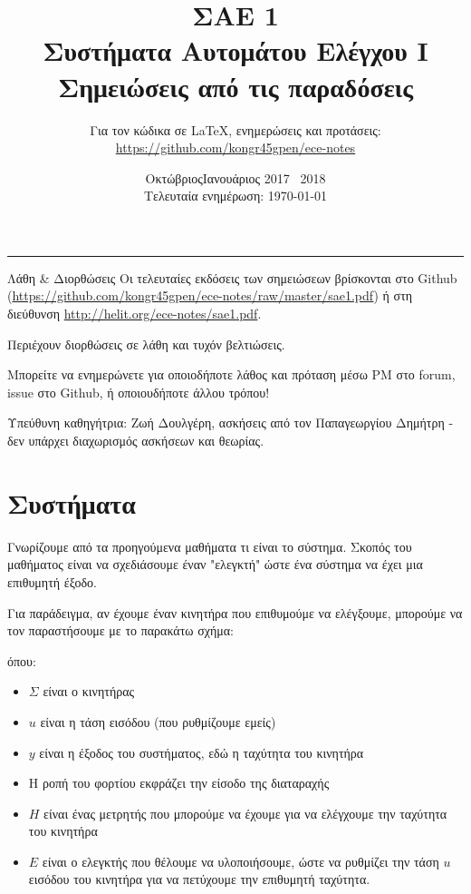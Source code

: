 \documentclass[11pt,a4paper,notitlepage,fleqn]{article}
\title{ΣΑΕ 1
	\\
	{ 
		\normalsize Συστήματα Αυτομάτου Ελέγχου I
		\\
		\normalsize Σημειώσεις από τις παραδόσεις
	}}
\date{Οκτώβριος\textendash Ιανουάριος 2017 \textendash~2018
	\\
	{ 
		\small Τελευταία ενημέρωση: \today
	}
}
\author{
	Για τον κώδικα σε \LaTeX, ενημερώσεις και προτάσεις:
	\\
	\url{https://github.com/kongr45gpen/ece-notes}}
\begin{document}
\maketitle

\hrule
\vspace{50pt}

\begin{infobox}{Λάθη \& Διορθώσεις}
	Οι τελευταίες εκδόσεις των σημειώσεων βρίσκονται στο Github
	(\url{https://github.com/kongr45gpen/ece-notes/raw/master/sae1.pdf}) ή
	στη διεύθυνση \url{http://helit.org/ece-notes/sae1.pdf}.
	
	Περιέχουν διορθώσεις σε λάθη και τυχόν βελτιώσεις.
	
	\tcblower
	
	Μπορείτε να ενημερώνετε για οποιοδήποτε λάθος και πρόταση
	μέσω PM στο forum, issue στο Github, ή οποιουδήποτε άλλου τρόπου!
\end{infobox}
	
Υπεύθυνη καθηγήτρια: Ζωή Δουλγέρη, ασκήσεις από τον Παπαγεωργίου Δημήτρη - δεν υπάρχει διαχωρισμός ασκήσεων και θεωρίας.

\newpage

\tableofcontents

\newpage

\section{Συστήματα}
Γνωρίζουμε από τα προηγούμενα μαθήματα τι είναι το σύστημα. Σκοπός του μαθήματος είναι να σχεδιάσουμε έναν "ελεγκτή" ώστε ένα σύστημα να έχει μια επιθυμητή έξοδο.

Για παράδειγμα, αν έχουμε έναν κινητήρα που επιθυμούμε να ελέγξουμε, μπορούμε να τον παραστήσουμε με το παρακάτω σχήμα:


όπου:
\begin{itemize}
	\item \( \Sigma \) είναι ο κινητήρας
	\item \( u \) είναι η τάση εισόδου (που ρυθμίζουμε εμείς)
	\item \( y \) είναι η έξοδος του συστήματος, εδώ η ταχύτητα του κινητήρα
	\item Η ροπή του φορτίου εκφράζει την είσοδο της διαταραχής
	\item \( H \) είναι ένας μετρητής που μπορούμε να έχουμε για να ελέγχουμε την ταχύτητα
	του κινητήρα
	\item \( E \) είναι ο ελεγκτής που θέλουμε να υλοποιήσουμε, ώστε να ρυθμίζει την
	τάση \( u \) εισόδου του κινητήρα για να πετύχουμε την επιθυμητή ταχύτητα.
\end{itemize}
\end{document}
